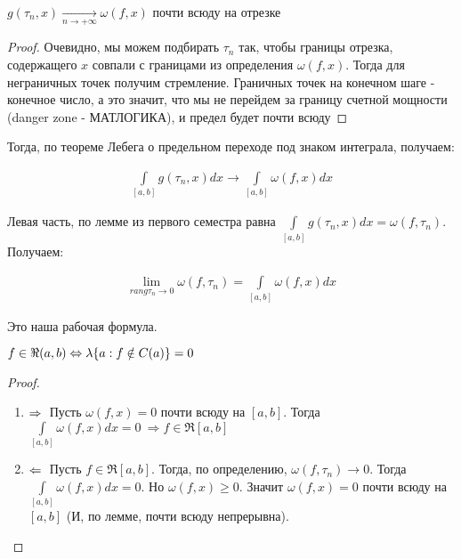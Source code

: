 \begin{statement}
$g(\tau_n, x) \xrightarrow[n \rightarrow +\infty]{} \omega(f, x)$ почти всюду на отрезке
\end{statement}

\begin{proof}
    Очевидно, мы можем подбирать $\tau_n$ так, чтобы границы отрезка, содержащего $x$ 
    совпали с границами из определения $\omega(f,x)$. Тогда для неграничных точек получим стремление. 
    Граничных точек на конечном шаге - конечное число, а это значит, что мы не перейдем за границу счетной 
    мощности (danger zone - МАТЛОГИКА), и предел будет почти всюду 
\end{proof}

Тогда, по теореме Лебега о предельном переходе под знаком интеграла, получаем:

\begin{gather*}
    \int\limits_{[a, b]}g(\tau_n, x)dx \rightarrow \int\limits_{[a,b]}\omega(f,x)dx
\end{gather*}

Левая часть, по лемме из первого семестра равна $\int\limits_{[a, b]}g(\tau_n, x)dx = \omega(f, \tau_n)$.
Получаем:

\begin{gather*}
    \lim\limits_{rang\tau_n \rightarrow 0} \omega(f, \tau_n) = \int\limits_{[a,b]} \omega(f,x)dx
\end{gather*}

Это наша рабочая формула.

\begin{theorem}
    $\\ f \in \Re (a, b) \Leftrightarrow \lambda\{ a : f \notin C(a) \} = 0$
\end{theorem}

\begin{proof}
	\begin{enumerate}
		\item 
			$\Rightarrow \\$ Пусть $\omega(f,x) = 0$ почти всюду на $[a, b]$. Тогда $\int\limits_{[a,b]} \omega(f, x)dx = 0 \: \Rightarrow f \in \Re [a,b]$ 
		\item 
			$\Leftarrow \\$ Пусть $f \in \Re [a, b]$. Тогда, по определению, $\omega(f, \tau_n) \rightarrow 0$. 
            Тогда $\int\limits_{[a,b]} \omega(f, x)dx = 0$. Но $\omega(f, x) \geqslant 0$. 
            Значит $\omega(f,x) = 0$ почти всюду на $[a,b]$ (И, по лемме, почти всюду непрерывна).
	\end{enumerate}
\end{proof}


